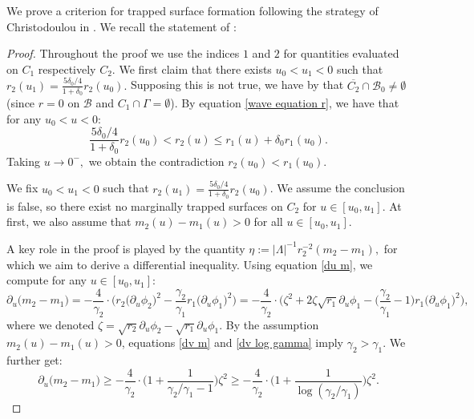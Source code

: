 \documentclass[11pt]{article}
\numberwithin{equation}{section}
\begin{document}
We prove a criterion for trapped surface formation following the strategy of Christodoulou in \cite{ChrBH}. We recall the statement of :
\trapped*
\begin{proof}
    Throughout the proof we use the indices $1$ and $2$ for quantities evaluated on $C_1$ respectively $C_2.$ We first claim that there exists $u_0<u_1<0$ such that $r_2(u_1)=\frac{5\delta_0/4}{1+\delta_0}r_{2}(u_0).$ Supposing this is not true, we have by  that $\overline{C_2}\cap\mathcal{B}_0\neq\emptyset$ (since $r=0$ on $\mathcal{B}$ and $C_1\cap\Gamma=\emptyset$). By equation \eqref{wave equation r}, we have that for any $u_0<u<0:$
    \[\frac{5\delta_0/4}{1+\delta_0}r_{2}(u_0)<r_2(u)\leq r_1(u)+\delta_0r_1(u_0).\]
    Taking $u\rightarrow0^-,$ we obtain the contradiction $r_{2}(u_0)<r_1(u_0).$

    We fix $u_0<u_1<0$ such that $r_2(u_1)=\frac{5\delta_0/4}{1+\delta_0}r_{2}(u_0)$. We assume the conclusion is false, so there exist no marginally trapped surfaces on $C_2$ for $u\in[u_0,u_1].$ At first, we also assume that $m_2(u)-m_1(u)>0$ for all $u\in[u_0,u_1]$.

    A key role in the proof is played by the quantity $\eta:=|\Lambda|^{-1}r_2^{-2}(m_2-m_1),$ for which we aim to derive a differential inequality. Using equation \eqref{du m}, we compute for any $u\in[u_0,u_1]$:
    \[\partial_u\big(m_2-m_1\big)=-\frac{4}{\gamma_2}\cdot\bigg(r_2\big(\partial_u\phi_2\big)^2-\frac{\gamma_2}{\gamma_1}r_1\big(\partial_u\phi_1\big)^2\bigg)=-\frac{4}{\gamma_2}\cdot\bigg(\zeta^2+2\zeta\sqrt{r_1}\partial_u\phi_1-\bigg(\frac{\gamma_2}{\gamma_1}-1\bigg)r_1\big(\partial_u\phi_1\big)^2\bigg),\]
    where we denoted $\zeta=\sqrt{r_2}\partial_u\phi_2-\sqrt{r_1}\partial_u\phi_1.$ By the assumption $m_2(u)-m_1(u)>0$, equations \eqref{dv m} and \eqref{dv log gamma} imply $\gamma_2>\gamma_1.$ We further get:
    \begin{equation}\label{prelim lower bound du m}
        \partial_u\big(m_2-m_1\big)\geq-\frac{4}{\gamma_2}\cdot\bigg(1+\frac{1}{\gamma_2/\gamma_1-1}\bigg)\zeta^2\geq-\frac{4}{\gamma_2}\cdot\bigg(1+\frac{1}{\log(\gamma_2/\gamma_1)}\bigg)\zeta^2.
    \end{equation}


\end{proof}
\end{document}
